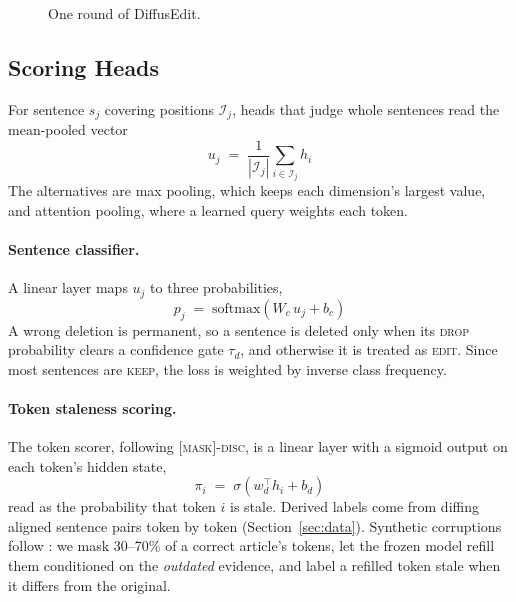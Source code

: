 \documentclass[11pt]{article}
\newcommand{\keep}{\textsc{keep}}
\newcommand{\edit}{\textsc{edit}}
\newcommand{\drop}{\textsc{drop}}
\newcommand{\maskdisc}{\textsc{[mask]-disc}}
\begin{document}
\begin{figure}[t]
\centering

\caption{One round of DiffusEdit.}
\label{fig:pipeline}
\end{figure}

\subsection{Scoring Heads}
\label{sec:heads}

For sentence $s_j$ covering positions $\mathcal{I}_j$, heads that judge whole sentences read the mean-pooled vector
\begin{equation}
u_j \;=\; \frac{1}{|\mathcal{I}_j|} \sum_{i \in \mathcal{I}_j} h_i
\label{eq:pool}
\end{equation}
The alternatives are max pooling, which keeps each dimension's largest value, and attention pooling, where a learned query weights each token.

\paragraph{Sentence classifier.}
A linear layer maps $u_j$ to three probabilities,
\begin{equation}
p_j \;=\; \mathrm{softmax}\!\left(W_c\, u_j + b_c\right)
\label{eq:cls}
\end{equation}
A wrong deletion is permanent, so a sentence is deleted only when its \drop{} probability clears a confidence gate $\tau_d$, and otherwise it is treated as \edit{}. Since most sentences are \keep{}, the loss is weighted by inverse class frequency.

\paragraph{Token staleness scoring.}
The token scorer, following \maskdisc{}, is a linear layer with a sigmoid output on each token's hidden state,
\begin{equation}
\pi_i \;=\; \sigma\!\left(w_d^\top h_i + b_d\right)
\label{eq:token}
\end{equation}
read as the probability that token $i$ is stale. Derived labels come from diffing aligned sentence pairs token by token (Section~\ref{sec:data}). Synthetic corruptions follow \citet{zou-etal-2026-detect}: we mask 30--70\% of a correct article's tokens, let the frozen model refill them conditioned on the \emph{outdated} evidence, and label a refilled token stale when it differs from the original.
\end{document}
